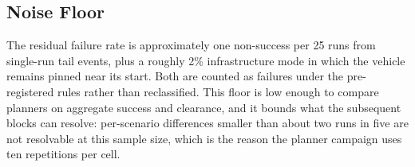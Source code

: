 \subsection{Noise Floor}

The residual failure rate is approximately one non-success per 25 runs from
single-run tail events, plus a roughly 2\% infrastructure mode in which the
vehicle remains pinned near its start. Both are counted as failures under the
pre-registered rules rather than reclassified. This floor is low enough to
compare planners on aggregate success and clearance, and it bounds what the
subsequent blocks can resolve: per-scenario differences smaller than about
two runs in five are not resolvable at this sample size, which is the reason
the planner campaign uses ten repetitions per cell.
